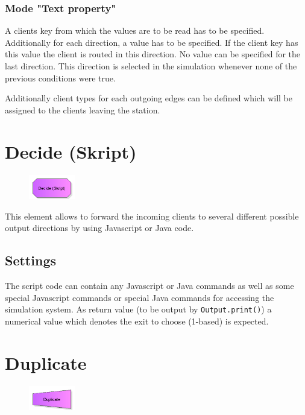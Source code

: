 \subsubsection*{Mode "Text property"}

A clients key from which the values are to be read has to be specified.
Additionally for each direction, a value has to be specified. If the client key has this value the client
is routed in this direction. No value can be specified for the last direction. This direction is selected in the simulation
whenever none of the previous conditions were true.

Additionally client types for each outgoing edges can be
defined which will be assigned to the clients leaving the station.


\section{Decide (Skript)}
\label{ref:ModelElementDecideJS}

\begin{figure}
\vspace{-22pt}
\includegraphics[width=2cm]{imageModelElementDecideJS.png}
\vspace{-22pt}
\end{figure}

This element allows to forward the incoming clients to several different possible
output directions by using Javascript or Java code.

\subsection*{Settings}

The script code can contain any Javascript or Java commands as well as some
special Javascript commands or
special Java commands for accessing the simulation system.
As return value (to be output by \texttt{Output.print()}) a numerical value
which denotes the exit to choose (1-based) is expected.


\section{Duplicate}
\label{ref:ModelElementDuplicate}

\begin{figure}
\vspace{-22pt}
\includegraphics[width=2cm]{imageModelElementDuplicate.png}
\vspace{-22pt}
\end{figure}

